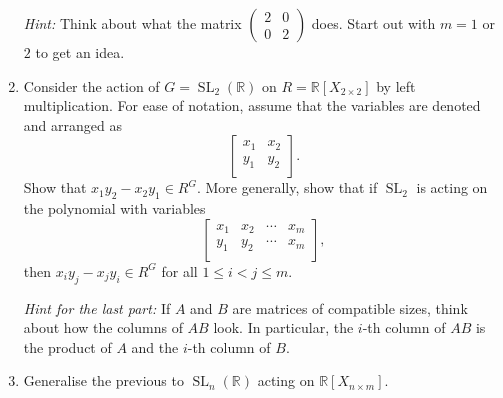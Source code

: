 \documentclass{article}
\DeclareMathOperator{\SL}{SL}
\newcommand{\halfitem}{\item[\number\numexpr\value{enumi}+0.5\relax.]}
\newcommand{\smatrix}[1]{\left(\begin{smallmatrix} #1 \end{smallmatrix}\right)}
\begin{document}
\begin{enumerate}[label=\arabic*., leftmargin=*]
	\emph{Hint:} Think about what the matrix $\smatrix{2 & 0 \\ 0 & 2}$ does. \newline
	Start out with $m = 1$ or $2$ to get an idea. 
	\item Consider the action of $G = \SL_{2}(\mathbb{R})$ on $R = \mathbb{R}[X_{2 \times 2}]$ by left multiplication. For ease of notation, assume that the variables are denoted and arranged as
	\begin{equation*} 
		\begin{bmatrix}
			x_{1} & x_{2} \\
			y_{1} & y_{2} \\
		\end{bmatrix}.
	\end{equation*}
	Show that $x_{1} y_{2} - x_{2} y_{1} \in R^{G}$. 
	More generally, show that if $\SL_{2}$ is acting on the polynomial with variables
	\begin{equation*} 
		\begin{bmatrix}
			x_{1} & x_{2} & \cdots & x_{m} \\
			y_{1} & y_{2} & \cdots & x_{m} \\
		\end{bmatrix},
	\end{equation*}
	then $x_{i} y_{j} - x_{j} y_{i} \in R^{G}$ for all $1 \le i < j \le m$. 

	\emph{Hint for the last part:} If $A$ and $B$ are matrices of compatible sizes, think about how the columns of $A B$ look. In particular, the $i$-th column of $A B$ is the product of $A$ and the $i$-th column of $B$. 
	\halfitem Generalise the previous to $\SL_{n}(\mathbb{R})$ acting on $\mathbb{R}[X_{n \times m}]$. 
\end{enumerate}
	
\end{document}
